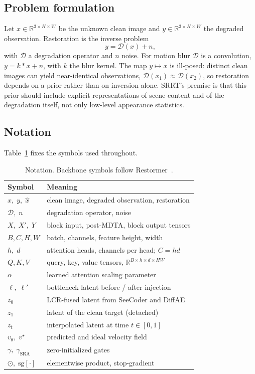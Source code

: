 \documentclass[conference]{IEEEtran}
\begin{document}
\subsection{Problem formulation}
Let $x\in\mathbb{R}^{3\times H\times W}$ be the unknown clean image and
$y\in\mathbb{R}^{3\times H\times W}$ the degraded observation. Restoration is
the inverse problem
\begin{equation}
y = \mathcal{D}(x) + n,
\label{eq:inverse}
\end{equation}
with $\mathcal{D}$ a degradation operator and $n$ noise. For motion blur
$\mathcal{D}$ is a convolution, $y = k * x + n$, with $k$ the blur kernel. The
map $y\mapsto x$ is ill-posed: distinct clean images can yield near-identical
observations, $\mathcal{D}(x_1)\approx\mathcal{D}(x_2)$, so restoration depends
on a prior rather than on inversion alone. SRRT's premise is that this prior
should include explicit representations of scene content and of the degradation
itself, not only low-level appearance statistics.

\subsection{Notation}
Table~\ref{tab:notation} fixes the symbols used throughout.

\begin{table}[t]
\caption{Notation. Backbone symbols follow Restormer~\cite{restormer}.}
\label{tab:notation}
\centering
\footnotesize
\setlength{\tabcolsep}{3.5pt}
\begin{tabular}{@{}ll@{}}
\toprule
Symbol & Meaning \\
\midrule
$x,\;y,\;\hat{x}$ & clean image, degraded observation, restoration \\
$\mathcal{D},\;n$ & degradation operator, noise \\
$X,\;X',\;Y$ & block input, post-MDTA, block output tensors \\
$B,C,H,W$ & batch, channels, feature height, width \\
$h,\;d$ & attention heads, channels per head; $C=hd$ \\
$Q,K,V$ & query, key, value tensors, $\mathbb{R}^{B\times h\times d\times HW}$ \\
$\alpha$ & learned attention scaling parameter \\
$\ell,\;\ell'$ & bottleneck latent before / after injection \\
$z_0$ & LCR-fused latent from SeeCoder and DiffAE \\
$z_1$ & latent of the clean target (detached) \\
$z_t$ & interpolated latent at time $t\in[0,1]$ \\
$v_\theta,\;v^\star$ & predicted and ideal velocity field \\
$\gamma,\;\gamma_{\text{SRA}}$ & zero-initialized gates \\
$\odot,\;\mathrm{sg}[\cdot]$ & elementwise product, stop-gradient \\
\bottomrule
\end{tabular}
\end{table}
\end{document}
